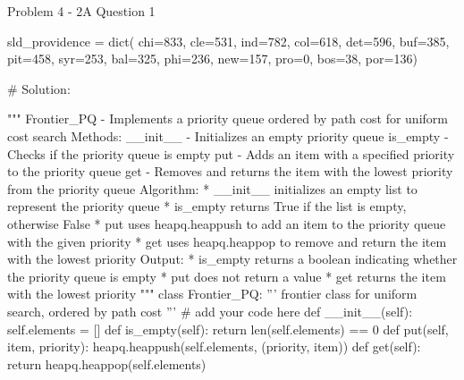\begin{problem}{Problem 4 - 2A Question 1}
\begin{highlight}[Solution]
\begin{code}[Python]
    sld_providence = dict(
        chi=833,
        cle=531,
        ind=782,
        col=618,
        det=596,
        buf=385,
        pit=458,
        syr=253,
        bal=325,
        phi=236,
        new=157,
        pro=0,
        bos=38,
        por=136)
    
    # Solution:
    
    """ Frontier_PQ - Implements a priority queue ordered by path cost for uniform cost search
        Methods:
            __init__ - Initializes an empty priority queue
            is_empty - Checks if the priority queue is empty
            put - Adds an item with a specified priority to the priority queue
            get - Removes and returns the item with the lowest priority from the priority queue
        Algorithm:
            * __init__ initializes an empty list to represent the priority queue
            * is_empty returns True if the list is empty, otherwise False
            * put uses heapq.heappush to add an item to the priority queue with the given priority
            * get uses heapq.heappop to remove and return the item with the lowest priority
        Output:
            * is_empty returns a boolean indicating whether the priority queue is empty
            * put does not return a value
            * get returns the item with the lowest priority
    """
    class Frontier_PQ:
        ''' frontier class for uniform search, ordered by path cost '''
        # add your code here
        def __init__(self):
            self.elements = []
        def is_empty(self):
            return len(self.elements) == 0
        def put(self, item, priority):
            heapq.heappush(self.elements, (priority, item))
        def get(self):
            return heapq.heappop(self.elements)
    

\end{code}
\end{highlight}
\end{problem}

